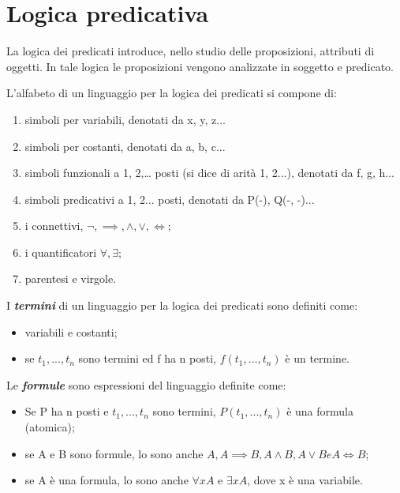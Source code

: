 \chapter{Logica predicativa}
La logica dei predicati introduce, nello studio delle proposizioni, attributi di oggetti. In tale logica le proposizioni vengono analizzate in soggetto e predicato.

L’alfabeto di un linguaggio per la logica dei predicati si compone di:
\begin{enumerate}
    \item simboli per variabili, denotati da x, y, z...
    \item simboli per costanti, denotati da a, b, c...
    \item simboli funzionali a 1, 2,… posti (si dice di arità 1, 2...), denotati da f, g, h...
    \item simboli predicativi a 1, 2... posti, denotati da P(-), Q(-, -)...
    \item i connettivi, $\neg, \implies, \land, \lor, \iff$;
    \item i quantificatori $\forall, \exists$;
    \item parentesi e virgole.
\end{enumerate}

I \textbf{\textit{termini}} di un linguaggio per la logica dei predicati sono definiti come: 
\begin{itemize}
    \item variabili e costanti;
    \item se $t_1, ..., t_n$ sono termini ed f ha n posti, $f (t_1, ..., t_n)$ è un termine.
\end{itemize}

Le \textbf{\textit{formule}} sono espressioni del linguaggio definite come:
\begin{itemize}
    \item Se P ha n posti e $t_1, ..., t_n$ sono termini, $P (t_1, ..., t_n)$ è una formula (atomica);
    \item se A e B sono formule, lo sono anche $A, A \implies B, A \land B, A \lor B e A \iff B$;
    \item se A è una formula, lo sono anche $\forall x A$ e $\exists x A$, dove x è una variabile.
\end{itemize}

